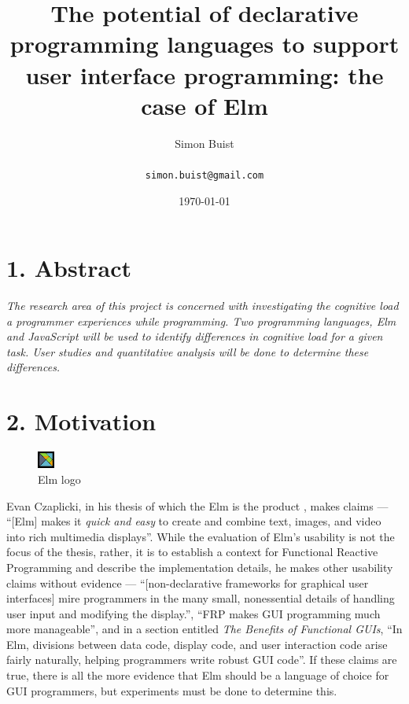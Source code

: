 \documentclass[final]{beamer}
\title
[none] %
{ %
The potential of declarative programming languages to support user interface
programming: the case of Elm
}
\author{ %
	Simon Buist\\
	\vspace{10mm}\ \\
	\texttt{simon.buist@gmail.com}
}
\institute
{The University of Bath} %
\date{\today}
\begin{document}
\begin{frame}[t]
\begin{multicols}{3}

\section{1. Abstract}

\textit{The research area of this project is concerned with investigating the cognitive
load a programmer experiences while programming. Two programming languages, Elm
and JavaScript will be
used to identify differences in cognitive load for a given task. User studies
and quantitative analysis will be done to determine these differences.}

\section{2. Motivation}

\begin{figure}
  \vspace{-20pt}
    \begin{center}
      \includegraphics[width=0.05\textwidth]{elmLogo.pdf}
    \end{center}
   \vspace{-10pt}
   \caption{Elm logo}
   \vspace{-20pt}
\end{figure}

Evan Czaplicki, in his thesis of which the Elm is the product
\cite{Czaplicki2012elm}, makes claims --- ``[Elm] makes it \textit{quick
and easy} to create and combine text, images, and video into rich
multimedia displays''. While the evaluation of Elm's usability is not the
focus of the thesis, rather, it is to establish a context for Functional
Reactive Programming and describe the implementation details, he makes
other usability claims without evidence --- ``[non-declarative frameworks
for graphical user interfaces] mire programmers in the many small,
nonessential details of handling user input and modifying the display.'',
``FRP makes GUI programming much more manageable'', and in a section
entitled \textit{The Benefits of Functional GUIs}, ``In Elm, divisions between
data code, display code, and user interaction code arise fairly
naturally, helping programmers write robust GUI code''. If these claims
are true, there is all the more evidence that Elm should be a language
of choice for GUI programmers, but experiments must be done to determine
this.


\end{multicols}
\end{frame}
\end{document}
